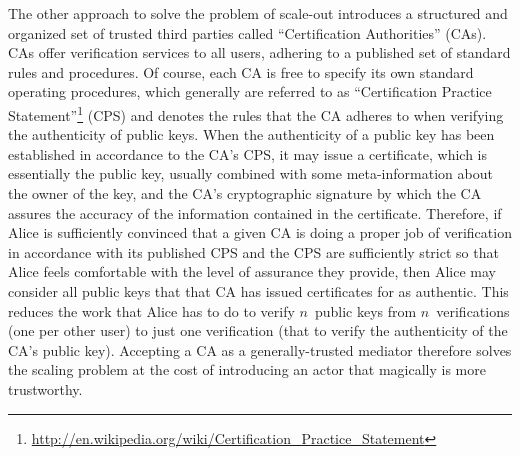 The other approach to solve the problem of scale-out introduces a
structured and organized set of trusted third parties called
``Certification Authorities'' (CAs).  CAs offer verification services to
all users, adhering to a published set of standard rules and procedures.
Of course, each CA is free to specify its own standard operating
procedures, which generally are referred to as ``Certification Practice
Statement''\footnote{\url{http://en.wikipedia.org/wiki/Certification_Practice_Statement}}
(CPS) and denotes the rules that the CA adheres to when verifying the
authenticity of public keys.  When the authenticity of a public key has
been established in accordance to the CA's CPS, it may issue a certificate,
which is essentially the public key, usually combined with some
meta-information about the owner of the key, and the CA's cryptographic
signature by which the CA assures the accuracy of the information contained
in the certificate.  Therefore, if Alice is sufficiently convinced that a
given CA is doing a proper job of verification in accordance with its
published CPS and the CPS are sufficiently strict so that Alice feels
comfortable with the level of assurance they provide, then Alice may
consider all public keys that that CA has issued certificates for as
authentic.  This reduces the work that Alice has to do to verify $n$~public
keys from $n$~verifications (one per other user) to just one verification
(that to verify the authenticity of the CA's public key).  Accepting a CA
as a generally-trusted mediator therefore solves the scaling problem at the
cost of introducing an actor that magically is more trustworthy.



